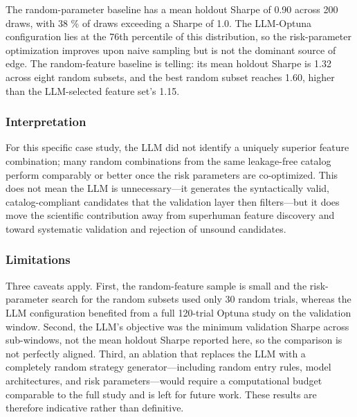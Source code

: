 \documentclass[11pt,a4paper]{article}
\begin{document}
The random-parameter baseline has a mean holdout Sharpe of 0.90 across 200 draws, with 38 \% of draws exceeding a Sharpe of 1.0. The LLM-Optuna configuration lies at the 76th percentile of this distribution, so the risk-parameter optimization improves upon naive sampling but is not the dominant source of edge. The random-feature baseline is telling: its mean holdout Sharpe is 1.32 across eight random subsets, and the best random subset reaches 1.60, higher than the LLM-selected feature set's 1.15.

\subsubsection{Interpretation}

For this specific case study, the LLM did not identify a uniquely superior feature combination; many random combinations from the same leakage-free catalog perform comparably or better once the risk parameters are co-optimized. This does not mean the LLM is unnecessary---it generates the syntactically valid, catalog-compliant candidates that the validation layer then filters---but it does move the scientific contribution away from superhuman feature discovery and toward systematic validation and rejection of unsound candidates.

\subsubsection{Limitations}

Three caveats apply. First, the random-feature sample is small and the risk-parameter search for the random subsets used only 30 random trials, whereas the LLM configuration benefited from a full 120-trial Optuna study on the validation window. Second, the LLM's objective was the minimum validation Sharpe across sub-windows, not the mean holdout Sharpe reported here, so the comparison is not perfectly aligned. Third, an ablation that replaces the LLM with a completely random strategy generator---including random entry rules, model architectures, and risk parameters---would require a computational budget comparable to the full study and is left for future work. These results are therefore indicative rather than definitive.
\end{document}
